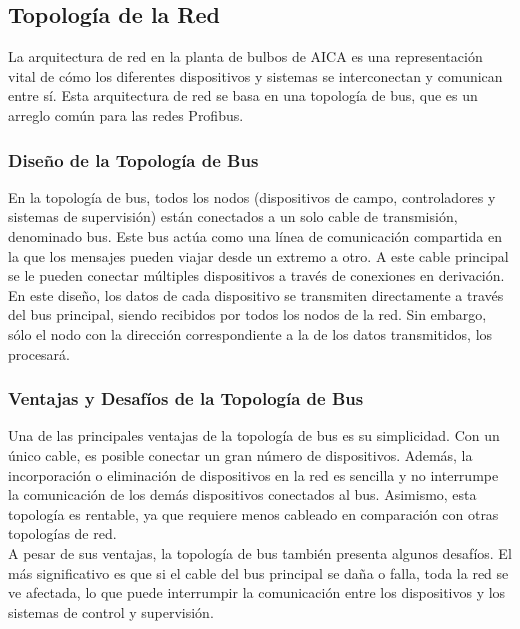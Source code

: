 \subsection{Topología de la Red}

La arquitectura de red en la planta de bulbos de AICA es una representación vital de cómo los diferentes dispositivos y sistemas se interconectan y comunican entre sí. Esta arquitectura de red se basa en una topología de bus, que es un arreglo común para las redes Profibus.\\

\subsubsection{Diseño de la Topología de Bus}


En la topología de bus, todos los nodos (dispositivos de campo, controladores y sistemas de supervisión) están conectados a un solo cable de transmisión, denominado bus. Este bus actúa como una línea de comunicación compartida en la que los mensajes pueden viajar desde un extremo a otro. A este cable principal se le pueden conectar múltiples dispositivos a través de conexiones en derivación. En este diseño, los datos de cada dispositivo se transmiten directamente a través del bus principal, siendo recibidos por todos los nodos de la red. Sin embargo, sólo el nodo con la dirección correspondiente a la de los datos transmitidos, los procesará.\\

\subsubsection{Ventajas y Desafíos de la Topología de Bus}


Una de las principales ventajas de la topología de bus es su simplicidad. Con un único cable, es posible conectar un gran número de dispositivos. Además, la incorporación o eliminación de dispositivos en la red es sencilla y no interrumpe la comunicación de los demás dispositivos conectados al bus. Asimismo, esta topología es rentable, ya que requiere menos cableado en comparación con otras topologías de red.\\

A pesar de sus ventajas, la topología de bus también presenta algunos desafíos. El más significativo es que si el cable del bus principal se daña o falla, toda la red se ve afectada, lo que puede interrumpir la comunicación entre los dispositivos y los sistemas de control y supervisión.\\

